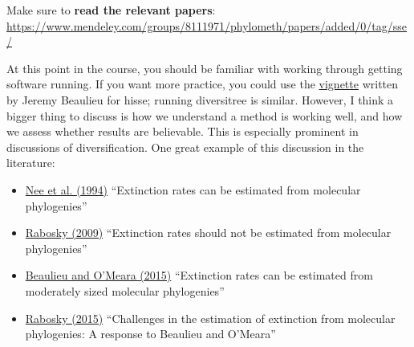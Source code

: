 \documentclass[]{article}
\providecommand{\tightlist}{%
  \setlength{\itemsep}{0pt}\setlength{\parskip}{0pt}}
\theoremstyle{definition}
\theoremstyle{definition}
\theoremstyle{definition}
\theoremstyle{remark}
\begin{document}
Make sure to \textbf{read the relevant papers}:
\url{https://www.mendeley.com/groups/8111971/phylometh/papers/added/0/tag/sse/}

At this point in the course, you should be familiar with working through
getting software running. If you want more practice, you could use the
\href{https://cran.r-project.org/web/packages/hisse/vignettes/hisse-vignette.html}{vignette}
written by Jeremy Beaulieu for hisse; running diversitree is similar.
However, I think a bigger thing to discuss is how we understand a method
is working well, and how we assess whether results are believable. This
is especially prominent in discussions of diversification. One great
example of this discussion in the literature:

\begin{itemize}
\tightlist
\item
  \href{http://rstb.royalsocietypublishing.org/content/344/1307/77}{Nee
  et al. (1994)} ``Extinction rates can be estimated from molecular
  phylogenies''
\item
  \href{http://onlinelibrary.wiley.com/doi/10.1111/j.1558-5646.2009.00926.x/abstract}{Rabosky
  (2009)} ``Extinction rates should not be estimated from molecular
  phylogenies''
\item
  \href{http://onlinelibrary.wiley.com/doi/10.1111/evo.12614/abstract}{Beaulieu
  and O'Meara (2015)} ``Extinction rates can be estimated from
  moderately sized molecular phylogenies''
\item
  \href{http://onlinelibrary.wiley.com/doi/10.1111/evo.12820/full}{Rabosky
  (2015)} ``Challenges in the estimation of extinction from molecular
  phylogenies: A response to Beaulieu and O'Meara''
\end{itemize}
\end{document}
